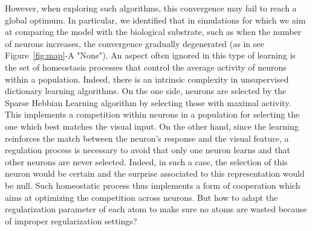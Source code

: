 \documentclass[vision,article,submit,oneauthor,pdftex]{Definitions/mdpi}
\begin{document}
However, when exploring such algorithms, this convergence may fail to reach a global optimum. In particular, we identified that in simulations for which we aim at comparing the model with the biological substrate, such as when the number of neurons increases, the convergence gradually degenerated (as in see Figure~\ref{fig:map}-A "None"). An aspect often ignored in this type of learning is the set of homeostasis processes that control the average activity of neurons within a population. Indeed, there is an intrinsic complexity in unsupervised dictionary learning algorithms. On the one side, neurons are selected by the Sparse Hebbian Learning algorithm by selecting those with maximal activity. This implements a competition within neurons in a population for selecting the one which best matches the visual input. On the other hand, since the learning reinforces the match between the neuron's response and the visual feature, a regulation process is necessary to avoid that only one neuron learns and that other neurons are never selected. Indeed, in such a case, the selection of this neuron would be certain and the surprise associated to this representation would be null. Such homeostatic process thus implements a form of cooperation which aims at optimizing the competition across neurons. But how to adapt the regularization parameter of each atom to make sure no atoms are wasted because of improper regularization settings?
\end{document}
